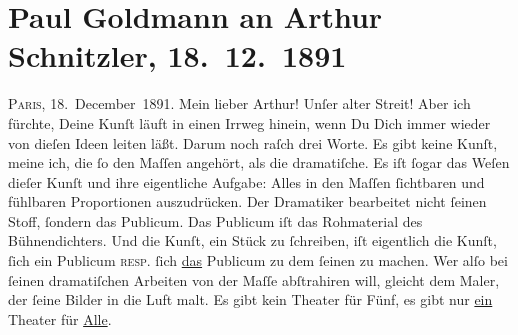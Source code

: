 

         
         \renewcommand{\erwaehntePersonen}{Personen: Hermann Bahr, Richard Beer-Hofmann, Paul Goldmann, Hugo von Hofmannsthal, Hilda von Mitis,  Porges}
         \renewcommand{\erwaehnteOrte}{Orte: Brüssel, Paris, Wien}
         \renewcommand{\erwaehnteWerke}{Werke: Das Märchen. Schauspiel in drei Aufzügen, Die Hochzeit von Valeni, Tagebuch}
               \section[Paul Goldmann an Arthur Schnitzler, 18. 12. 1891]{ Paul Goldmann an Arthur Schnitzler, 18. 12. 1891}\nopagebreak{}\rehead{ }\begin{ledgroupsized}[t]{13cm}\normalsize\beginnumbering{} \toendnotes[C]{\smallbreak\pagebreak[2]} 
\toendnotes[C]{\smallbreak}\pstart
           \raggedleft{}{\pb}\textsc{Paris}, 18. December 1891.\pend
           \pstart\center{}Mein lieber Arthur!\pend\pstart
           Unſer alter Streit! Aber ich fürchte, Deine Kunſt läuft in einen Irrweg hinein, wenn
               Du Dich immer wieder von dieſen Ideen leiten läßt. Darum noch raſch drei Worte. Es
               gibt keine Kunſt, meine ich, die ſo  den Maſſen angehört, als die dramatiſche. Es iſt ſogar das Weſen dieſer Kunſt
               und ihre eigentliche Aufgabe: Alles in den Maſſen ſichtbaren und fühlbaren
               Proportionen auszudrücken. Der Dramatiker bearbeitet nicht ſeinen Stoff, ſondern das
               Publicum. Das Publicum iſt das Rohmaterial des Bühnendichters. Und die Kunſt, ein
               Stück zu ſchreiben, iſt eigentlich die Kunſt, ſich ein Publicum \textsc{resp.} ſich \uline{das} Publicum {\pb}zu dem ſeinen zu machen. Wer alſo bei ſeinen
               dramatiſchen Arbeiten von der Maſſe abſtrahiren will, gleicht dem Maler, der ſeine
               Bilder in die Luft malt. Es gibt kein Theater für Fünf, es gibt nur \uline{ein} Theater für \uline{Alle}.

\end{ledgroupsized}
